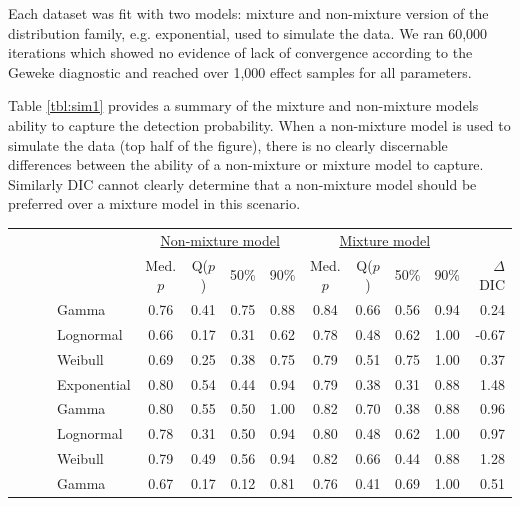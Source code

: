 \documentclass[useAMS,usenatbib,referee,12pt]{article}
\begin{document}
Each dataset was fit with two models: mixture and non-mixture version of the distribution family, e.g. exponential, used to simulate the data.
We ran 60,000 iterations which showed no evidence of lack of convergence according to the Geweke diagnostic and reached over 1,000 effect samples for all parameters.

Table \ref{tbl:sim1} provides a summary of the mixture and non-mixture models ability to capture the detection probability. 
When a non-mixture model is used to simulate the data (top half of the figure), there is no clearly discernable differences between the ability of a non-mixture or mixture model to capture. Similarly DIC cannot clearly determine that a non-mixture model should be preferred over a mixture model in this scenario. 

\begin{table}[ht]\centering\small
\begin{tabular}{l|l|l|l|cccc|cccc||r}
 \multicolumn{4}{c|}{ } & \multicolumn{4}{c|}{\underline{Non-mixture model}} & \multicolumn{4}{c||}{\underline{Mixture model}} & \\
 \multicolumn{4}{c|}{ } & Med. $p$ & Q($p$) & 50\% & 90\% & Med. $p$ & Q($p$) & 50\% & 90\% & $\Delta$ DIC \\ 
  \hline
  \hline
 \parbox[t]{2mm}{} & \parbox[t]{2mm}{} & \parbox[t]{2mm}{} & Gamma & 0.76 & 0.41 & 0.75 & 0.88 & 0.84 & 0.66 & 0.56 & 0.94 & 0.24 \\ 
 & & &   Lognormal & 0.66 & 0.17 & 0.31 & 0.62 & 0.78 & 0.48 & 0.62 & 1.00 & -0.67 \\ 
 & & &   Weibull & 0.69 & 0.25 & 0.38 & 0.75 & 0.79 & 0.51 & 0.75 & 1.00 & 0.37 \\ 
 & & &   Exponential & 0.80 & 0.54 & 0.44 & 0.94 & 0.79 & 0.38 & 0.31 & 0.88 & 1.48 \\ 
 & & \parbox[t]{2mm}{} &  Gamma & 0.80 & 0.55 & 0.50 & 1.00 & 0.82 & 0.70 & 0.38 & 0.88 & 0.96 \\ 
 & & &   Lognormal & 0.78 & 0.31 & 0.50 & 0.94 & 0.80 & 0.48 & 0.62 & 1.00 & 0.97 \\ 
 & & &   Weibull & 0.79 & 0.49 & 0.56 & 0.94 & 0.82 & 0.66 & 0.44 & 0.88 & 1.28 \\ 
& \parbox[t]{2mm}{} & \parbox[t]{2mm}{} & Gamma & 0.67 & 0.17 & 0.12 & 0.81 & 0.76 & 0.41 & 0.69 & 1.00 & 0.51 \\ 

\end{tabular}
\end{table}
\end{document}
